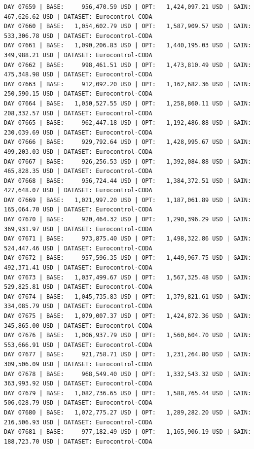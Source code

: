 \documentclass[11pt,a4paper]{article}
\begin{document}
\begin{verbatim}
DAY 07659 | BASE:     956,470.59 USD | OPT:   1,424,097.21 USD | GAIN: 467,626.62 USD | DATASET: Eurocontrol-CODA
DAY 07660 | BASE:   1,054,602.79 USD | OPT:   1,587,909.57 USD | GAIN: 533,306.78 USD | DATASET: Eurocontrol-CODA
DAY 07661 | BASE:   1,090,206.83 USD | OPT:   1,440,195.03 USD | GAIN: 349,988.21 USD | DATASET: Eurocontrol-CODA
DAY 07662 | BASE:     998,461.51 USD | OPT:   1,473,810.49 USD | GAIN: 475,348.98 USD | DATASET: Eurocontrol-CODA
DAY 07663 | BASE:     912,092.20 USD | OPT:   1,162,682.36 USD | GAIN: 250,590.15 USD | DATASET: Eurocontrol-CODA
DAY 07664 | BASE:   1,050,527.55 USD | OPT:   1,258,860.11 USD | GAIN: 208,332.57 USD | DATASET: Eurocontrol-CODA
DAY 07665 | BASE:     962,447.18 USD | OPT:   1,192,486.88 USD | GAIN: 230,039.69 USD | DATASET: Eurocontrol-CODA
DAY 07666 | BASE:     929,792.64 USD | OPT:   1,428,995.67 USD | GAIN: 499,203.03 USD | DATASET: Eurocontrol-CODA
DAY 07667 | BASE:     926,256.53 USD | OPT:   1,392,084.88 USD | GAIN: 465,828.35 USD | DATASET: Eurocontrol-CODA
DAY 07668 | BASE:     956,724.44 USD | OPT:   1,384,372.51 USD | GAIN: 427,648.07 USD | DATASET: Eurocontrol-CODA
DAY 07669 | BASE:   1,021,997.20 USD | OPT:   1,187,061.89 USD | GAIN: 165,064.70 USD | DATASET: Eurocontrol-CODA
DAY 07670 | BASE:     920,464.32 USD | OPT:   1,290,396.29 USD | GAIN: 369,931.97 USD | DATASET: Eurocontrol-CODA
DAY 07671 | BASE:     973,875.40 USD | OPT:   1,498,322.86 USD | GAIN: 524,447.46 USD | DATASET: Eurocontrol-CODA
DAY 07672 | BASE:     957,596.35 USD | OPT:   1,449,967.75 USD | GAIN: 492,371.41 USD | DATASET: Eurocontrol-CODA
DAY 07673 | BASE:   1,037,499.67 USD | OPT:   1,567,325.48 USD | GAIN: 529,825.81 USD | DATASET: Eurocontrol-CODA
DAY 07674 | BASE:   1,045,735.83 USD | OPT:   1,379,821.61 USD | GAIN: 334,085.79 USD | DATASET: Eurocontrol-CODA
DAY 07675 | BASE:   1,079,007.37 USD | OPT:   1,424,872.36 USD | GAIN: 345,865.00 USD | DATASET: Eurocontrol-CODA
DAY 07676 | BASE:   1,006,937.79 USD | OPT:   1,560,604.70 USD | GAIN: 553,666.91 USD | DATASET: Eurocontrol-CODA
DAY 07677 | BASE:     921,758.71 USD | OPT:   1,231,264.80 USD | GAIN: 309,506.09 USD | DATASET: Eurocontrol-CODA
DAY 07678 | BASE:     968,549.40 USD | OPT:   1,332,543.32 USD | GAIN: 363,993.92 USD | DATASET: Eurocontrol-CODA
DAY 07679 | BASE:   1,082,736.65 USD | OPT:   1,588,765.44 USD | GAIN: 506,028.79 USD | DATASET: Eurocontrol-CODA
DAY 07680 | BASE:   1,072,775.27 USD | OPT:   1,289,282.20 USD | GAIN: 216,506.93 USD | DATASET: Eurocontrol-CODA
DAY 07681 | BASE:     977,182.49 USD | OPT:   1,165,906.19 USD | GAIN: 188,723.70 USD | DATASET: Eurocontrol-CODA

\end{verbatim}
\end{document}
